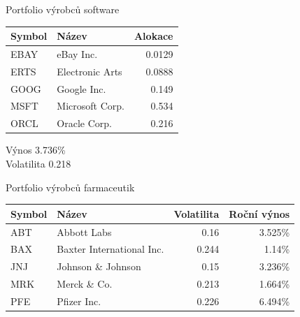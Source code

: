 \begin{frame}{Portfolio výrobců software}
      \begin{tabular}{|l|l|r|}
        \hline
        Symbol&Název&Alokace\\\hline\hline
        EBAY&eBay Inc. &0.0129\\\hline
        ERTS&Electronic Arts &0.0888\\\hline
        GOOG&Google Inc. &0.149\\\hline
        MSFT&Microsoft Corp. &0.534\\\hline
        ORCL&Oracle Corp. &0.216\\\hline
      \end{tabular}
      
      Výnos 3.736\%\\
      Volatilita 0.218
\end{frame}

\begin{frame}{Portfolio výrobců farmaceutik}
      \begin{tabular}{|l|l|r|r|}
        \hline
        Symbol&Název&Volatilita&Roční výnos\\\hline\hline
        ABT&Abbott Labs &0.16&3.525\%\\\hline
        BAX&Baxter International Inc. &0.244&1.14\%\\\hline
        JNJ&Johnson \& Johnson &0.15&3.236\%\\\hline
        MRK&Merck \& Co. &0.213&1.664\%\\\hline
        PFE&Pfizer Inc. &0.226&6.494\%\\\hline
      \end{tabular}
\end{frame}

